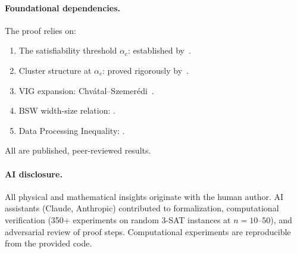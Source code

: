 \documentclass[11pt]{article}
\theoremstyle{definition}
\begin{document}
\paragraph{Foundational dependencies.}
The proof relies on:
\begin{enumerate}
\item The satisfiability threshold $\alpha_c$: established
by~\cite{DingSly2015}.
\item Cluster structure at $\alpha_c$: proved rigorously
by~\cite{AchlioptasCoja2008,DingSly2015}.
\item VIG expansion: Chv\'{a}tal--Szemer\'{e}di~\cite{Chvatal1988}.
\item BSW width-size relation: \cite{BenSasson2001}.
\item Data Processing Inequality: \cite{CoverThomas2006}.
\end{enumerate}
All are published, peer-reviewed results.

\paragraph{AI disclosure.}
All physical and mathematical insights originate with the human author.
AI assistants (Claude, Anthropic) contributed to formalization,
computational verification (350+ experiments on random 3-SAT instances
at $n = 10$--$50$), and adversarial review of proof steps.
Computational experiments are reproducible from the provided code.

\end{document}
